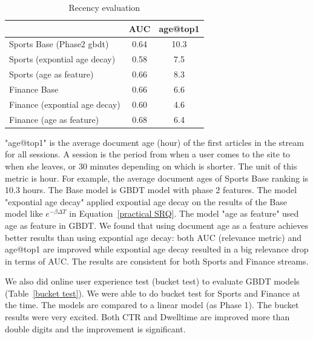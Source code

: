 \begin{table} 
\caption{ Recency evaluation }\label{recency}
\begin{tabular}{|p{50mm}|c|c|}\hline
     & AUC & age@top1 \\ \hline
Sports Base (Phase2 gbdt) &  0.64 & 10.3  \\ \hline
Sports (expontial age decay) & 0.58 & 7.5 \\ \hline
Sports (age as feature) & 0.66  & 8.3 \\ \hline \hline
Finance Base & 0.66 & 6.6 \\ \hline
Finance (expontial age decay) & 0.60 & 4.6 \\ \hline
Finance (age as feature)  & 0.68 & 6.4 \\ \hline
\end{tabular}

\end{table}

"age@top1" is the average document age (hour) of the first articles in the stream for all sessions. A session is the period from when a user comes to the site to when she leaves, or 30 minutes depending on which is shorter. The unit of this metric is hour. For example, the average document ages of Sports Base ranking is 10.3 hours.   The Base model is GBDT model with phase 2 features.     The model "expontial age decay"  applied expontial age decay on the results of the Base model like $e^{-\beta \Delta T}$ in Equation~\ref{practical SRQ}. The model "age as feature" used age as feature in GBDT. 
We found that using document age as a feature achieves better results than using expontial age decay: both AUC (relevance metric) and age@top1 are improved while expontial age decay resulted in a big relevance drop in terms of AUC.
The results are consistent for both Sports and Finance streams. 


We also did online user experience test (bucket test) to evaluate GBDT models (Table~\ref{bucket test}). We were able to do bucket test for Sports and Finance at the time. The models are compared to a linear model (as Phase 1). The bucket results were very excited. Both CTR and Dwelltime are improved more than double digits and the improvement is significant. 

